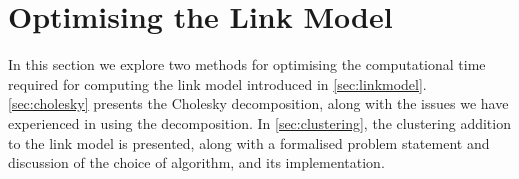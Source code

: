 \section{Optimising the Link Model}\label{sec:optimization}
In this section we explore two methods for optimising the computational time required for computing the link model introduced in \autoref{sec:linkmodel}. \autoref{sec:cholesky} presents the Cholesky decomposition, along with the issues we have experienced in using the decomposition. In \autoref{sec:clustering}, the clustering addition to the link model is presented, along with a formalised problem statement and discussion of the choice of algorithm, and its implementation.



